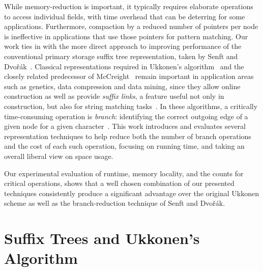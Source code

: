 \documentclass{llncs}
\begin{document}
While memory-reduction is important, it typically requires elaborate operations
to access individual fields, with time overhead that can be deterring for some
applications. Furthermore, compaction by a reduced number of pointers per node
is ineffective in applications that use those pointers for pattern matching. Our
work ties in with the more direct approach to improving performance of the
conventional primary storage suffix tree representation, taken by Senft and
Dvořák~\cite{SenftBranching}. Classical representations required in Ukkonen's
algorithm~\cite{UkkoOnli} and the closely related predecessor of
McCreight~\cite{McR} remain important in application areas such as genetics,
data compression and data mining, since they allow online construction as well
as provide \emph{suffix links}, a feature useful not only in construction,
but also for string matching tasks~\cite{gusfield,kielbasa2011adaptive}. In
these algorithms, a critically time-consuming operation is \emph{branch}:
identifying the correct outgoing edge of a given node for a given
character~\cite{SenftBranching}. This work introduces and evaluates several
representation techniques to help reduce both the number of branch operations
and the cost of each such operation, focusing on running time, and taking an
overall liberal view on space usage.

Our experimental evaluation of runtime, memory locality, and the counts for
critical operations, shows that a well chosen combination of our presented
techniques consistently produce a significant advantage over the original
Ukkonen scheme as well as the branch-reduction technique of Senft and Dvořák.


\section{Suffix Trees and Ukkonen's Algorithm}\label{sec-defs}
\end{document}
